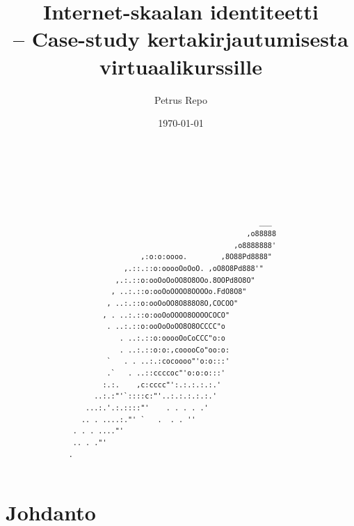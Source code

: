 \documentclass[finnish,gradu]{tktltiki}
\begin{document}
\title{Internet-skaalan identiteetti
    \\ -- Case-study kertakirjautumisesta virtuaalikurssille}

\author{Petrus Repo}
\date{\today}
\maketitle

\onehalfspacing

\subject{Tietojenkäsittelytiede}


\begin{abstract}
  \begin{singlespacing}
  \begin{verbatim}






                                                        ___
                                                     ,o88888
                                                  ,o8888888'
                            ,:o:o:oooo.        ,8O88Pd8888"
                        ,.::.::o:ooooOoOoO. ,oO8O8Pd888'"
                      ,.:.::o:ooOoOoOO8O8OOo.8OOPd8O8O"
                     , ..:.::o:ooOoOOOO8OOOOo.FdO8O8"
                    , ..:.::o:ooOoOO8O888O8O,COCOO"
                   , . ..:.::o:ooOoOOOO8OOOOCOCO"
                    . ..:.::o:ooOoOoOO8O8OCCCC"o
                       . ..:.::o:ooooOoCoCCC"o:o
                       . ..:.::o:o:,cooooCo"oo:o:
                    `   . . ..:.:cocoooo"'o:o:::'
                    .`   . ..::ccccoc"'o:o:o:::'
                   :.:.    ,c:cccc"':.:.:.:.:.'
                 ..:.:"'`::::c:"'..:.:.:.:.:.'
               ...:.'.:.::::"'    . . . . .'
              .. . ....:."' `   .  . . ''
            . . . ...."'
            .. . ."'
           .

  \end{verbatim}
  \end{singlespacing}
\end{abstract}

\setcounter{tocdepth}{3}
\mytableofcontents

\section{Johdanto} %
\label{sec:johdanto}
\end{document}
